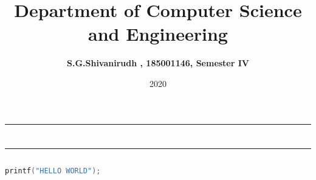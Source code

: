 \documentclass[12pt,letterpaper,,margin=0.75in]{article}
\title{\textbf{Department of Computer Science and Engineering}}
\author{\textbf{S.G.Shivanirudh , 185001146, Semester IV }}
\date{2020}
\begin{document}
\maketitle
\hrule
\section*{}
\hrule 
\bigskip \bigskip

\subsection*{}

\subsection*{}
\begin{flushleft}
\end{flushleft}

\subsection*{}
\begin{flushleft}
\end{flushleft}

\begin{lstlisting}[language=C]
printf("HELLO WORLD");
\end{lstlisting}
\end{document}
